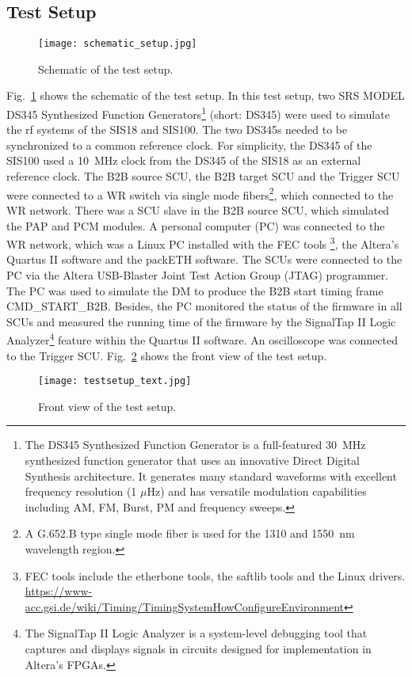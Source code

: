 \subsection{Test Setup}
\label{sec:test_timing}
\begin{figure}[H]
   \centering   
   \texttt{[image: schematic\_setup.jpg]}
   \caption{Schematic of the test setup.}
   \label{setup}
\end{figure}
Fig.~\ref{setup} shows the schematic of the test setup. In this test setup, two SRS MODEL DS345 Synthesized Function Generators\footnote{The DS345 Synthesized Function Generator is a full-featured \SI{30}{\MHz} synthesized function generator that uses an innovative Direct Digital Synthesis architecture. It generates many standard waveforms with excellent frequency resolution (1 $\mu$Hz) and has versatile modulation capabilities including AM, FM, Burst, PM and frequency sweeps.} (short: DS345) were used to simulate the rf systems of the SIS18 and SIS100. The two DS345s needed to be synchronized to a common reference clock. For simplicity, the DS345 of the SIS100 used a \SI{10}{\MHz} clock from the DS345 of the SIS18 as an external reference clock. The B2B source SCU, the B2B target SCU and the Trigger SCU were connected to a WR switch via single mode fibers\footnote{A G.652.B type single mode fiber is used for the 1310 and \SI{1550}{nm} wavelength region.}, which connected to the WR network. There was a SCU slave in the B2B source SCU, which simulated the PAP and PCM modules. A personal computer (\gls{PC}) was connected to the WR network, which was a Linux PC installed with the FEC tools \footnote{FEC tools include the etherbone tools, the saftlib tools and the Linux drivers. \\ \url{https://www-acc.gsi.de/wiki/Timing/TimingSystemHowConfigureEnvironment}}, the Altera's Quartus II software and the packETH software. The SCUs were connected to the PC via the Altera USB-Blaster Joint Test Action Group (JTAG) programmer. The PC was used to simulate the DM to produce the B2B start timing frame CMD\_START\_B2B. Besides, the PC monitored the status of the firmware in all SCUs and measured the running time of the firmware by the SignalTap II Logic Analyzer\footnote{The SignalTap II Logic Analyzer is a system-level debugging tool that captures and displays signals in circuits designed for implementation in Altera’s FPGAs.} feature within the Quartus II software. An oscilloscope was connected to the Trigger SCU. Fig.~\ref{testsetup_text} shows the front view of the test setup. 
\begin{figure}[!htb]
   \centering   
   \texttt{[image: testsetup\_text.jpg]}
   \caption{Front view of the test setup.}
   \label{testsetup_text}
\end{figure}

